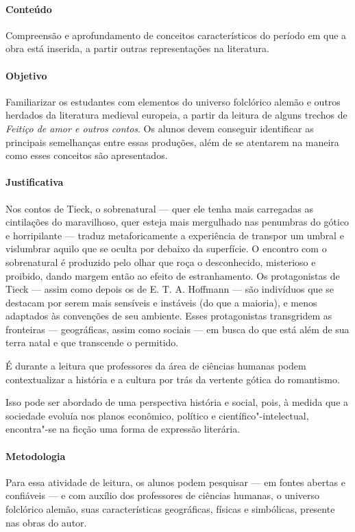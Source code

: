 \documentclass[12pt]{extarticle}
\begin{document}
\paragraph{Conteúdo} Compreensão e aprofundamento de conceitos característicos do período 
em que a obra está inserida, a partir outras representações na literatura.

\paragraph{Objetivo} Familiarizar os estudantes com elementos do universo folclórico alemão e outros herdados da 
literatura medieval europeia, a partir da leitura de alguns trechos de \emph{Feitiço de amor e outros contos}.
Os alunos devem conseguir identificar as principais semelhanças entre essas produções, além de se atentarem na 
maneira como esses conceitos são apresentados.

\paragraph{Justificativa} Nos contos de Tieck, o sobrenatural --- quer ele tenha mais carregadas
as cintilações do maravilhoso, quer esteja mais mergulhado nas penumbras
do gótico e horripilante --- traduz metaforicamente a experiência de
transpor um umbral e vislumbrar aquilo que se oculta por debaixo da
superfície. O encontro com o sobrenatural é produzido pelo olhar que
roça o desconhecido, misterioso e proibido, dando margem então ao efeito
de estranhamento. Os protagonistas de Tieck --- assim como depois os de
E. T. A. Hoffmann --- são indivíduos que se destacam por serem mais
sensíveis e instáveis (do que a maioria), e menos adaptados às
convenções de seu ambiente. Esses protagonistas transgridem as
fronteiras --- geográficas, assim como sociais --- em busca do que está
além de sua terra natal e que transcende o permitido.

É durante a leitura que professores da área de ciências humanas
podem contextualizar a história e a cultura por trás da vertente gótica
do romantismo.

Isso pode ser abordado de uma perspectiva história e social, pois, à
medida que a sociedade evoluía nos planos econômico, político e
científico"-intelectual, encontra"-se na ficção uma forma de expressão 
literária.

\paragraph{Metodologia}
Para essa atividade de leitura, os alunos podem pesquisar --- em fontes abertas 
e confiáveis --- e com auxílio dos professores de ciências humanas, o universo 
folclórico alemão, suas características geográficas, físicas e simbólicas, presente nas obras do autor.
\end{document}
